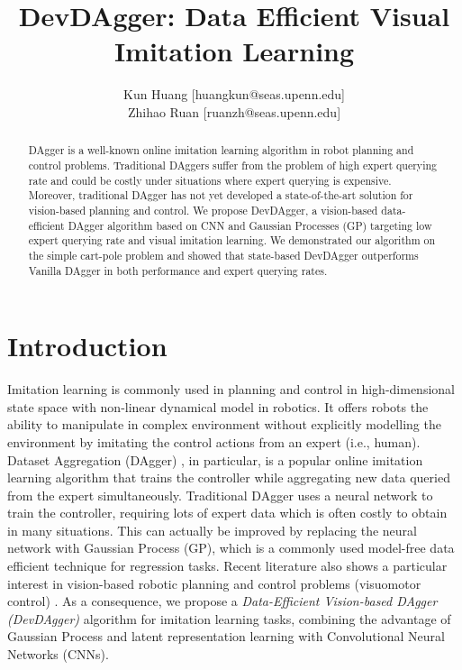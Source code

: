 \documentclass[11pt, reqno, letterpaper, twoside]{amsart}
\title{DevDAgger: Data Efficient Visual Imitation Learning}
\author{
Kun Huang [huangkun@seas.upenn.edu]\\
Zhihao Ruan [ruanzh@seas.upenn.edu] \\
}
\begin{document}

\begin{abstract}
	DAgger is a well-known online imitation learning algorithm in robot planning and control problems. Traditional DAggers suffer from the problem of high expert querying rate and could be costly under situations where expert querying is expensive. Moreover, traditional DAgger has not yet developed a state-of-the-art solution for vision-based planning and control. We propose DevDAgger, a vision-based data-efficient DAgger algorithm based on CNN and Gaussian Processes (GP) targeting low expert querying rate and visual imitation learning. We demonstrated our algorithm on the simple cart-pole problem and showed that state-based DevDAgger outperforms Vanilla DAgger in both performance and expert querying rates.
\end{abstract}

\maketitle

\section{Introduction}
Imitation learning is commonly used in planning and control in high-dimensional state space with non-linear dynamical model in robotics. It offers robots the ability to manipulate in complex environment without explicitly modelling the environment by imitating the control actions from an expert (i.e., human). Dataset Aggregation (DAgger) \cite{dagger}, in particular, is a popular online imitation learning algorithm that trains the controller while aggregating new data queried from the expert simultaneously. Traditional DAgger uses a neural network to train the controller, requiring lots of expert data which is often costly to obtain in many situations. This can actually be improved by replacing the neural network with Gaussian Process (GP), which is a commonly used model-free data efficient technique for regression tasks. Recent literature also shows a particular interest in vision-based robotic planning and control problems (visuomotor control) \cite{vision-based-RL,ebert2018visual,xie2018few}. As a consequence, we propose a \emph{Data-Efficient Vision-based DAgger (DevDAgger)} algorithm for imitation learning tasks, combining the advantage of Gaussian Process and latent representation learning with Convolutional Neural Networks (CNNs).
\end{document}
